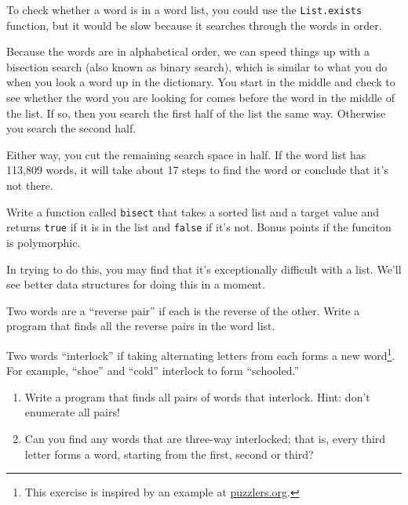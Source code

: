 \documentclass[10pt]{book}
\begin{document}
\begin{ex}
\label{wordlist1}
\label{bisection}




To check whether a word is in a word list, you could use
the {\tt List.exists} function, but it would be slow because it searches
through the words in order.

Because the words are in alphabetical order, we can speed things up
with a bisection search (also known as binary search), which is
similar to what you do when you look a word up in the dictionary.  You
start in the middle and check to see whether the word you are looking
for comes before the word in the middle of the list.  If so, then you
search the first half of the list the same way.  Otherwise you search
the second half.

Either way, you cut the remaining search space in half.  If the
word list has 113,809 words, it will take about 17 steps to
find the word or conclude that it's not there.

Write a function called {\tt bisect} that takes a sorted list
and a target value and returns {\tt true} if it is in the list
and {\tt false} if it's not. Bonus points if the funciton is 
polymorphic.

In trying to do this, you may find that it's exceptionally difficult
with a list. We'll see better data structures for doing this in a 
moment.

% 
\end{ex}

\begin{ex}

Two words are a ``reverse pair'' if each is the reverse of the
other.  Write a program that finds all the reverse pairs in the
word list. 
\end{ex}

\begin{ex}

Two words ``interlock'' if taking alternating letters from each forms
a new word\footnote{This exercise is inspired by an example at
  \url{puzzlers.org}.}.  For example, ``shoe'' and ``cold''
interlock to form ``schooled.''

\begin{enumerate}

\item Write a program that finds all pairs of words that interlock.
  Hint: don't enumerate all pairs!

\item Can you find any words that are three-way interlocked; that is,
  every third letter forms a word, starting from the first, second or
  third?

\end{enumerate}
\end{ex}
\end{document}
